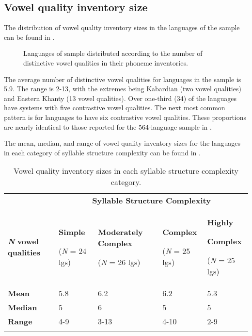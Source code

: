 \subsection{Vowel quality inventory size}\label{sec:4.3.1}

  The distribution of vowel quality inventory sizes in the languages of the sample can be found in .


\begin{figure}  
\caption{\label{fig:4.1} Languages of sample distributed according to the number of distinctive vowel qualities in their phoneme inventories.}
\end{figure}

  The average number of distinctive vowel qualities for languages in the sample is 5.9. The range is 2-13, with the extremes being Kabardian (two vowel qualities) and Eastern Khanty (13 vowel qualities). Over one-third (34) of the languages have systems with five contrastive vowel qualities. The next most common pattern is for languages to have six contrastive vowel qualities. These proportions are nearly identical to those reported for the 564-language sample in \citet{Maddieson2013c}.

  The mean, median, and range of vowel quality inventory sizes for the languages in each category of syllable structure complexity can be found in .

\begin{table}
\begin{tabularx}{\textwidth}{XXXXX}
 & \multicolumn{4}{c}{ \textbf{Syllable Structure Complexity}}\\
\lsptoprule
\textbf{\textit{N}} \textbf{vowel qualities} & { \textbf{Simple}}

 (\textit{N} = 24 lgs) & { \textbf{Moderately Complex}}

 (\textit{N} = 26 lgs) & { \textbf{Complex}}

 (\textit{N} = 25 lgs) & { \textbf{Highly} }

{ \textbf{Complex}}

 (\textit{N} = 25 lgs)\\
\textbf{Mean} & 5.8 & 6.2 & 6.2 & 5.3\\
\textbf{Median} & 5 & 6 & 5 & 5\\
\textbf{Range} & 4-9 & 3-13 & 4-10 & 2-9\\
\lspbottomrule
\end{tabularx}
\caption{\label{tab:4.2}Vowel quality inventory sizes in each syllable structure complexity category.}
\end{table}

